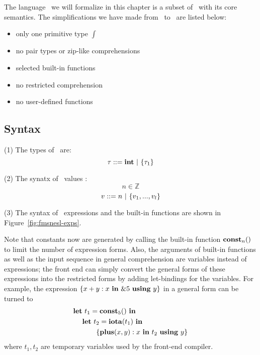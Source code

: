 \section{\fmsnesl}

The language \fmsnesl \ we will formalize in this chapter is a subset of \mysnesl \ with its core semantics. 
The simplifications we have made from \mysnesl \  to \fmsnesl \ are listed below:
\begin{itemize}
	\item only one primitive type $\int$ 
	\item no pair types or zip-like comprehensions
	\item selected built-in functions 
	\item no restricted comprehension
	\item no user-defined functions
\end{itemize}


\subsection{Syntax}

\noindent (1) The types of \fmsnesl \ are: 
$$\tau ::= \int \ | \ \tseq{\tau_1}$$

\noindent (2) The synatx of \fmsnesl \ values : 
$$ n \in \mathbb{Z} $$
$$ v::= n \ | \ \{\replc{l}{v}\}$$

\noindent (3) The syntax of \fmsnesl \ expressions and the built-in functions are shown in Figure~\ref{fig:fmsnesl-exps}. 




Note that constants now are generated by calling the built-in function $\constn{n}()$ to limit the number of expression forms.
Also, the arguments of built-in functions as well as the input sequence in general comprehension are variables instead of expressions; the front end can simply convert the general forms of these expressions into the restricted forms by adding let-bindings for the variables. 
For example, the expression $\Comp{x+y}{x}{\&5}{y}$ in a general form can be turned to
\begin{alignat*}{2}
\*{let} & \ t_1 = \const{5} \ \*{in} \\
& \*{let} \ t_2 =  \iota{t_1} \ \*{in} \\
& \qquad \{ \plus{x}{y} :  x \ \*{in} \ t_2 \ \*{using}  \ y \}
\end{alignat*} 
where $t_1, t_2$ are temporary variables used by the front-end compiler.



